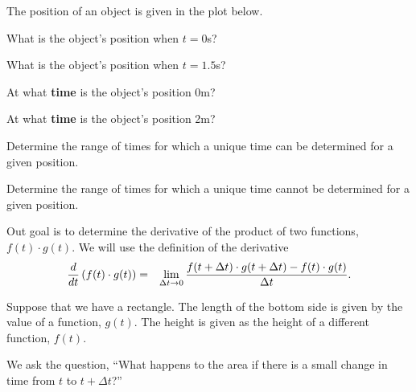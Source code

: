\begin{problem}

\item The position of an object is given in the plot below.

  \scalebox{0.55}{}

  \begin{subproblem}
    \item What is the object's position when $t=0$s?
      \vfill

    \item What is the object's position when $t=1.5$s?
      \vfill

    \item At what \textbf{time} is the object's position 0m?
      \vfill

    \item At what \textbf{time} is the object's position 2m?
      \vfill

    \item Determine the range of times for which a unique time can be
      determined for a given position.
      \vfill

    \item Determine the range of times for which a unique time cannot be
      determined for a given position.
      \vfill

  \end{subproblem}


\clearpage


\item Out goal is to determine the derivative of the product of two
  functions, $f(t)\cdot g(t)$. We will use the definition of the
  derivative
  \begin{eqnarray*}
    \frac{d}{dt} \left( f(t)\cdot g(t) \right) & = & 
          \lim_{\Delta t \rightarrow 0} \frac{f(t+\Delta t)\cdot g(t+\Delta t) - f(t)\cdot g(t)}{\Delta t}.
  \end{eqnarray*}

  Suppose that we have a rectangle. The length of the bottom side
  is given by the value of a function, $g(t)$. The height is given as the
  height of a different function, $f(t)$. 

  We ask the question, ``What happens to the area if there is a small
  change in time from $t$ to $t+\Delta t$?''


\end{problem}
